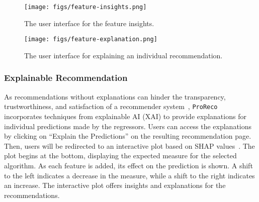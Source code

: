 \begin{figure}[h!]
    \centering
    \texttt{[image: figs/feature-insights.png]}
    \caption{
        The user interface for the feature insights. 
    } \label{fig:feature-insights}
\end{figure}

\begin{figure}[h!]
    \centering
    \texttt{[image: figs/feature-explanation.png]}
    \caption{
        The user interface for explaining an individual recommendation.
    } \label{fig:feature-exaplanation}
    \vspace{-2em}
\end{figure}

\subsubsection{Explainable Recommendation}
As recommendations without explanations can hinder the transparency, trustworthiness, and satisfaction of a recommender system~\cite{ZhangC20XRecommendation}, \texttt{ProReco} incorporates techniques from explainable AI (XAI) to provide explanations for individual predictions made by the regressors. 
Users can access the explanations by clicking on “Explain the Predictions” on the resulting recommendation page. 
Then, users will be redirected to an interactive plot based on SHAP values~\cite{LundbergL17SHAP}. 
The plot begins at the bottom, displaying the expected measure for the selected algorithm. 
As each feature is added, its effect on the prediction is shown. 
A shift to the left indicates a decrease in the measure, while a shift to the right indicates an increase. 
The interactive plot offers insights and explanations for the recommendations.